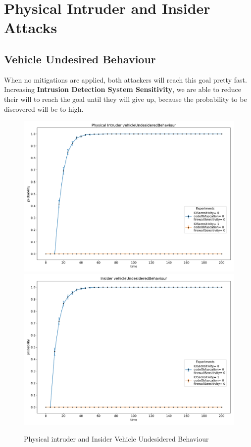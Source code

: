 \section{Physical Intruder and Insider Attacks}

\subsection*{Vehicle Undesired Behaviour}
When no mitigations are applied, both attackers will reach this goal pretty fast. Increasing 
\textbf{Intrusion Detection System Sensitivity}, we are able to reduce their will to reach the goal
until they will give up, because the probability to be discovered will be to high.
\begin{figure}[H]
    \begin{center}
        \includegraphics[scale=0.38]{img/Physical_vOB.pdf}
        \includegraphics[scale=0.38]{img/Insider_vOB.pdf}
    \end{center}
    \caption{Physical intruder and Insider Vehicle Undesidered Behaviour}
    \label{fig:P_I_vob}
    \vspace*{-3cm}
\end{figure}

